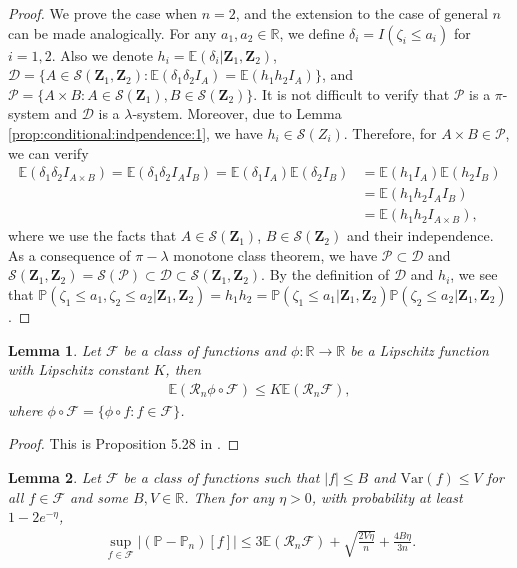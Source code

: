 \documentclass[11pt, preprint]{imsart}
\numberwithin{equation}{section}
\def \mcF{\mathcal{F}}
\def \mcD{\mathcal{D}}
\def \mcRn{\mathcal{R}_n}
\def \mcP{\mathcal{P}}
\def \bfZ{\mathbf{Z}}
\def \ev{\mathbb{E}}
\def \pr{\mathbb{P}}
\theoremstyle{plain}
\newtheorem{lemma}{\indent Lemma}
\theoremstyle{definition}
\begin{document}
\begin{proof}
We prove the case when $n=2$, and the extension to the case of general $n$ can be made analogically. For any $a_1, a_2\in \mathbb{R}$, we define $\delta_i=I(\zeta_i\leq a_i)$ for $i=1,2$. Also we denote $h_i=\ev(\delta_i | \bfZ_1, \bfZ_2)$, $\mcD=\{A\in \mathcal{S}(\bfZ_1, \bfZ_2) : \ev(\delta_1\delta_2 I_A)=\ev(h_1h_2I_A)\}$, and $\mcP=\{A\times B : A\in \mathcal{S}(\bfZ_1), B\in \mathcal{S}(\bfZ_2)\}$.  It is not difficult to verify that $\mcP$ is a $\pi$-system and $\mcD$ is a $\lambda$-system. Moreover, due to Lemma \ref{prop:conditional:indpendence:1}, we have $h_i \in \mathcal{S}(Z_i)$. Therefore, for $A\times B \in \mcP$, we can verify
\begin{align*}
\ev(\delta_1\delta_2I_{A\times B})=\ev(\delta_1\delta_2I_{A}I_{B})=\ev(\delta_1I_{A})\ev(\delta_2I_{B})
&=\ev(h_1I_{A})\ev(h_2I_{B})\nonumber\\
&=\ev(h_1h_2I_{A}I_{B})\nonumber\\
&=\ev(h_1h_2I_{A\times B}),\nonumber
\end{align*}
where we use the facts that $A\in \mathcal{S}(\bfZ_1)$, $B\in \mathcal{S}(\bfZ_2)$ and their independence. As a consequence of $\pi-\lambda$ monotone class theorem, we have $\mcP\subset \mcD$ and $\mathcal{S}(\bfZ_1, \bfZ_2)=\mathcal{S}(\mcP)\subset \mcD\subset \mathcal{S}(\bfZ_1, \bfZ_2)$. By the definition of $\mcD$ and $h_i$, we see that $\pr(\zeta_1\leq a_1, \zeta_2\leq a_2 | \bfZ_1, \bfZ_2)=h_1h_2=\pr(\zeta_1\leq a_1| \bfZ_1, \bfZ_2)\pr(\zeta_2\leq a_2| \bfZ_1, \bfZ_2)$. 
\end{proof}
\begin{lemma}\label{lemma:contraction:inequality}
Let $\mcF$ be a class of functions and $\phi: \mathbb{R}\to \mathbb{R}$ be a Lipschitz function with  Lipschitz constant $K$, then 
\begin{eqnarray}
	\ev(\mcRn  \phi\circ\mcF)\leq K\ev(\mcRn\mcF),\nonumber
\end{eqnarray}
where $\phi\circ\mcF=\{\phi\circ f: f\in \mcF\}$.
\end{lemma}
\begin{proof}
This is Proposition 5.28 in \cite{w19}.
\end{proof}
\begin{lemma}\label{lemma:concentration:inequality}
Let $\mcF$ be a class of functions such that $|f|\leq B$ and $\textrm{Var}(f)\leq V$ for all $f\in \mcF$ and some $B, V \in \mathbb{R}$. Then for any $\eta>0$, with probability at least $1-2e^{-\eta}$,
\begin{eqnarray}
	\sup_{f\in \mcF}\bigg|(\pr-\pr_n)[f]\bigg|\leq 3\ev(\mcRn\mcF)+\sqrt{\frac{2V\eta}{n}}+\frac{4B\eta}{3n}.\nonumber
\end{eqnarray}  
\end{lemma}
\end{document}
